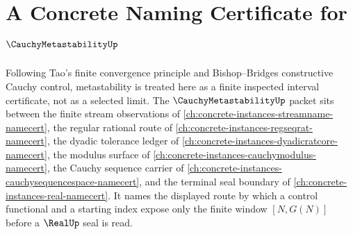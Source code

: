 \chapter{A Concrete Naming Certificate for $\CauchyMetastabilityUp$}
\label{ch:concrete-instances-cauchy-metastability-namecert}

Following Tao's finite convergence principle and Bishop--Bridges constructive Cauchy control, metastability is treated here as a finite inspected interval certificate, not as a selected limit. The $\CauchyMetastabilityUp$ packet sits between the finite stream observations of \autoref{ch:concrete-instances-streamname-namecert}, the regular rational route of \autoref{ch:concrete-instances-regseqrat-namecert}, the dyadic tolerance ledger of \autoref{ch:concrete-instances-dyadicratcore-namecert}, the modulus surface of \autoref{ch:concrete-instances-cauchymodulus-namecert}, the Cauchy sequence carrier of \autoref{ch:concrete-instances-cauchysequencespace-namecert}, and the terminal seal boundary of \autoref{ch:concrete-instances-real-namecert}. It names the displayed route by which a control functional and a starting index expose only the finite window $[N,G(N)]$ before a $\RealUp$ seal is read.

